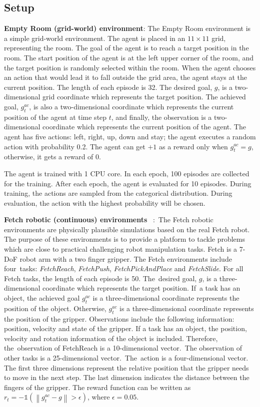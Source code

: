 \subsection{Setup}
\textbf{{Empty Room (grid-world) environment}}:
The Empty Room environment is a simple grid-world environment. The agent is placed in an $11\times11$ grid, representing the room. The goal of the agent is to reach a target position in the room. The start position of the agent is at the left upper corner of the room, and the target position is randomly selected  within the room. When the agent chooses an action that would lead it to fall outside the grid area, the agent stays at the current position. The length of each episode is 32. 
The desired goal, $g$, is a two-dimensional grid coordinate which represents the target position. The achieved goal, $g^{ac}_{t}$, is also a two-dimensional coordinate which represents the current position of the agent at time step $t$, and finally, the observation is a two-dimensional coordinate which represents the current position of the agent. 
The agent has five actions: left, right, up, down and stay; the agent executes a random action with probability 0.2. The agent can get $+1$ as a reward only when $g^{ac}_{t}=g$, otherwise, it gets a reward of $0$. 

The agent is trained with 1 CPU core. In each epoch, 100 episodes are collected for the training. After each epoch, the agent is evaluated for 10 episodes. During training, the actions are sampled from the categorical distribution. During evaluation, the action with the highest probability will be chosen. 

\textbf{{Fetch robotic (continuous) environments}%
}~\cite{plappert2018multi}:~The Fetch robotic environments are physically plausible simulations based on the real Fetch robot. The purpose of these environments is to provide a platform to tackle problems which are close to practical challenging robot manipulation tasks. Fetch is a 7-DoF robot arm with a two finger gripper. The Fetch environments include four~tasks: \emph{FetchReach}, \emph{FetchPush}, \emph{FetchPickAndPlace} and \emph{FetchSlide}. 
For all Fetch tasks, the length of each episode is 50. The~desired goal, $g$, is a three-dimensional coordinate which represents the target position. If~a task has an object, the achieved goal $g^{ac}_{t}$ is a three-dimensional coordinate represents the position of the object. Otherwise, $g^{ac}_{t}$ is a three-dimensional coordinate represents the position of the gripper.
Observations include the following information: position, velocity and state of the gripper. If a task has an object, the position, velocity and rotation information of the object is included. Therefore, the~observation of FetchReach is a 10-dimensional vector.~The observation of other tasks is a 25-dimensional vector.~The~action is a four-dimensional vector. The first three dimensions represent the relative position that the gripper needs to move in the next step. The last dimension indicates the distance between the fingers of the gripper.
The reward function can be written as $r_{t}=-\mathds{1}\left(\left\|g^{ac}_{t} - g\right\|>\epsilon\right)$, where $\epsilon =0.05$.

